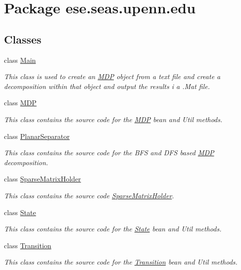 \hypertarget{namespaceese_1_1seas_1_1upenn_1_1edu}{}\section{Package ese.\+seas.\+upenn.\+edu}
\label{namespaceese_1_1seas_1_1upenn_1_1edu}
\subsection*{Classes}
\begin{DoxyCompactItemize}
\item 
class \hyperlink{classese_1_1seas_1_1upenn_1_1edu_1_1_main}{Main}
\begin{DoxyCompactList}\small\item\em This class is used to create an \hyperlink{classese_1_1seas_1_1upenn_1_1edu_1_1_m_d_p}{M\+D\+P} object from a text file and create a decomposition within that object and output the results i a .Mat file. \end{DoxyCompactList}\item 
class \hyperlink{classese_1_1seas_1_1upenn_1_1edu_1_1_m_d_p}{M\+D\+P}
\begin{DoxyCompactList}\small\item\em This class contains the source code for the \hyperlink{classese_1_1seas_1_1upenn_1_1edu_1_1_m_d_p}{M\+D\+P} bean and Util methods. \end{DoxyCompactList}\item 
class \hyperlink{classese_1_1seas_1_1upenn_1_1edu_1_1_planar_separator}{Planar\+Separator}
\begin{DoxyCompactList}\small\item\em This class contains the source code for the B\+F\+S and D\+F\+S based \hyperlink{classese_1_1seas_1_1upenn_1_1edu_1_1_m_d_p}{M\+D\+P} decomposition. \end{DoxyCompactList}\item 
class \hyperlink{classese_1_1seas_1_1upenn_1_1edu_1_1_sparse_matrix_holder}{Sparse\+Matrix\+Holder}
\begin{DoxyCompactList}\small\item\em This class contains the source code \hyperlink{classese_1_1seas_1_1upenn_1_1edu_1_1_sparse_matrix_holder}{Sparse\+Matrix\+Holder}. \end{DoxyCompactList}\item 
class \hyperlink{classese_1_1seas_1_1upenn_1_1edu_1_1_state}{State}
\begin{DoxyCompactList}\small\item\em This class contains the source code for the \hyperlink{classese_1_1seas_1_1upenn_1_1edu_1_1_state}{State} bean and Util methods. \end{DoxyCompactList}\item 
class \hyperlink{classese_1_1seas_1_1upenn_1_1edu_1_1_transition}{Transition}
\begin{DoxyCompactList}\small\item\em This class contains the source code for the \hyperlink{classese_1_1seas_1_1upenn_1_1edu_1_1_transition}{Transition} bean and Util methods. \end{DoxyCompactList}\end{DoxyCompactItemize}
